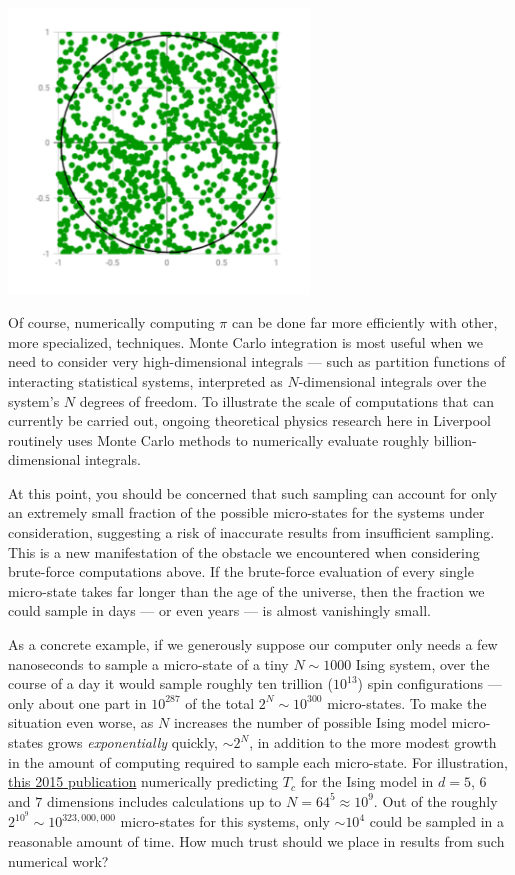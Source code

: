 \begin{center}\includegraphics[width=0.6\textwidth]{figs/unit10_pi.pdf}\end{center}

Of course, numerically computing $\pi$ can be done far more efficiently with other, more specialized, techniques.
Monte Carlo integration is most useful when we need to consider very high-dimensional integrals --- such as partition functions of interacting statistical systems, interpreted as $N$-dimensional integrals over the system's $N$ degrees of freedom.
To illustrate the scale of computations that can currently be carried out, ongoing theoretical physics research here in Liverpool routinely uses Monte Carlo methods to numerically evaluate roughly billion-dimensional integrals.

At this point, you should be concerned that such sampling can account for only an extremely small fraction of the possible micro-states for the systems under consideration, suggesting a risk of inaccurate results from insufficient sampling.
This is a new manifestation of the obstacle we encountered when considering brute-force computations above.
If the brute-force evaluation of every single micro-state takes far longer than the age of the universe, then the fraction we could sample in days --- or even years --- is almost vanishingly small.

As a concrete example, if we generously suppose our computer only needs a few nanoseconds to sample a micro-state of a tiny $N \sim 1000$ Ising system, over the course of a day it would sample roughly ten trillion ($10^{13}$) spin configurations --- only about one part in $10^{287}$ of the total $2^N \sim 10^{300}$ micro-states.
To make the situation even worse, as $N$ increases the number of possible Ising model micro-states grows \textit{exponentially} quickly, $\sim$$2^N$, in addition to the more modest growth in the amount of computing required to sample each micro-state.
For illustration, \href{https://arxiv.org/abs/1502.07613}{this 2015 publication} numerically predicting $T_c$ for the Ising model in $d = 5$, $6$ and $7$ dimensions includes calculations up to $N = 64^5 \approx 10^9$.
Out of the roughly $2^{10^9} \sim 10^{323{,}000{,}000}$ micro-states for this systems, only $\sim$$10^4$ could be sampled in a reasonable amount of time.
How much trust should we place in results from such numerical work?

